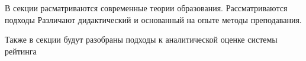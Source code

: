 В секции расматриваются современные теории образования. Рассматриваются подходы
Различают дидактический и основанный на опыте методы преподавания.

Также в секции будут разобраны подходы к аналитической оценке системы рейтинга